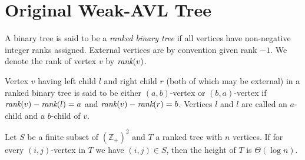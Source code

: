 

\section{Original Weak-AVL Tree}

\begin{defn}
A binary tree is said to be a {\em ranked binary tree} if all vertices have non-negative integer ranks assigned. External vertices are by convention given rank $-1$. We denote the rank of vertex $v$ by $\text{\it rank}(v)$.
\end{defn}

\begin{defn}
Vertex $v$ having left child $l$ and right child $r$ (both of which may be external) in a ranked binary tree is said to be either $(a,b)$-vertex or $(b,a)$-vertex if $\text{\it rank}(v) - \text{\it rank}(l) = a$ and $\text{\it rank}(v) - \text{\it rank}(r) = b$. Vertices $l$ and $l$ are called an $a$-child and a $b$-child of $v$.
\end{defn}

\begin{prop}
Let $S$ be a finite subset of ${(\mathbb{Z} _ +)}^2$ and $T$ a ranked tree with $n$ vertices. If for every $(i,j)$-vertex in $T$ we have $(i,j) \in S$, then the height of $T$ is $\Theta(\log n)$.
\label{thm-rbt-depth}
\end{prop}

